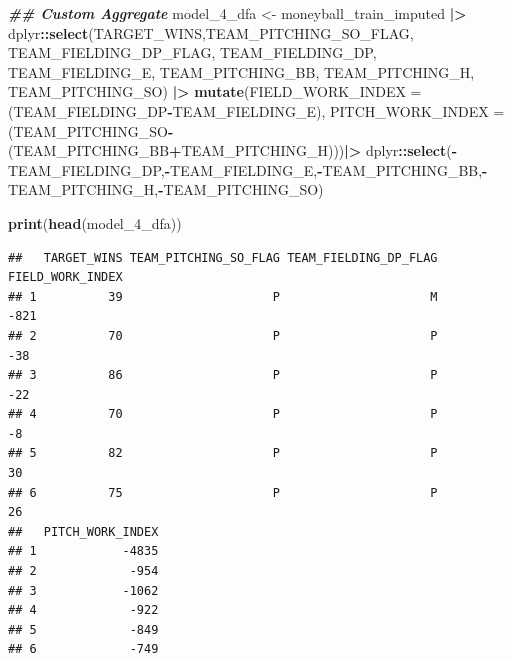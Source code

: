 \documentclass[
]{article}
\newenvironment{Shaded}{\begin{snugshade}}{\end{snugshade}}
\newcommand{\AttributeTok}[1]{\textcolor[rgb]{0.13,0.29,0.53}{#1}}
\newcommand{\DocumentationTok}[1]{\textcolor[rgb]{0.56,0.35,0.01}{\textbf{\textit{#1}}}}
\newcommand{\FunctionTok}[1]{\textcolor[rgb]{0.13,0.29,0.53}{\textbf{#1}}}
\newcommand{\NormalTok}[1]{#1}
\newcommand{\OtherTok}[1]{\textcolor[rgb]{0.56,0.35,0.01}{#1}}
\newcommand{\SpecialCharTok}[1]{\textcolor[rgb]{0.81,0.36,0.00}{\textbf{#1}}}
\begin{document}
\begin{Shaded}
\begin{Highlighting}[]
\DocumentationTok{\#\# Custom Aggregate}
\NormalTok{model\_4\_dfa }\OtherTok{\textless{}{-}}\NormalTok{ moneyball\_train\_imputed }\SpecialCharTok{|\textgreater{}} 
\NormalTok{  dplyr}\SpecialCharTok{::}\FunctionTok{select}\NormalTok{(TARGET\_WINS,TEAM\_PITCHING\_SO\_FLAG, TEAM\_FIELDING\_DP\_FLAG, TEAM\_FIELDING\_DP, TEAM\_FIELDING\_E, TEAM\_PITCHING\_BB, TEAM\_PITCHING\_H, TEAM\_PITCHING\_SO) }\SpecialCharTok{|\textgreater{}}
  \FunctionTok{mutate}\NormalTok{(}\AttributeTok{FIELD\_WORK\_INDEX =}\NormalTok{ (TEAM\_FIELDING\_DP}\SpecialCharTok{{-}}\NormalTok{TEAM\_FIELDING\_E),}
         \AttributeTok{PITCH\_WORK\_INDEX =}\NormalTok{ (TEAM\_PITCHING\_SO}\SpecialCharTok{{-}}\NormalTok{(TEAM\_PITCHING\_BB}\SpecialCharTok{+}\NormalTok{TEAM\_PITCHING\_H)))}\SpecialCharTok{|\textgreater{}}
\NormalTok{  dplyr}\SpecialCharTok{::}\FunctionTok{select}\NormalTok{(}\SpecialCharTok{{-}}\NormalTok{TEAM\_FIELDING\_DP,}\SpecialCharTok{{-}}\NormalTok{TEAM\_FIELDING\_E,}\SpecialCharTok{{-}}\NormalTok{TEAM\_PITCHING\_BB,}\SpecialCharTok{{-}}\NormalTok{TEAM\_PITCHING\_H,}\SpecialCharTok{{-}}\NormalTok{TEAM\_PITCHING\_SO)}

\FunctionTok{print}\NormalTok{(}\FunctionTok{head}\NormalTok{(model\_4\_dfa))}
\end{Highlighting}
\end{Shaded}

\begin{verbatim}
##   TARGET_WINS TEAM_PITCHING_SO_FLAG TEAM_FIELDING_DP_FLAG FIELD_WORK_INDEX
## 1          39                     P                     M             -821
## 2          70                     P                     P              -38
## 3          86                     P                     P              -22
## 4          70                     P                     P               -8
## 5          82                     P                     P               30
## 6          75                     P                     P               26
##   PITCH_WORK_INDEX
## 1            -4835
## 2             -954
## 3            -1062
## 4             -922
## 5             -849
## 6             -749
\end{verbatim}
\end{document}
